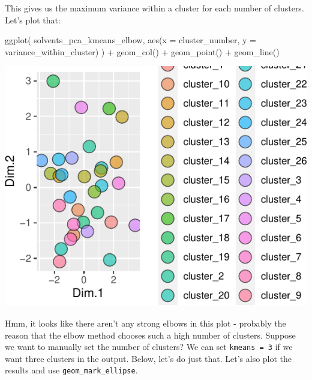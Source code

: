 \documentclass[
]{krantz}
\newenvironment{Shaded}{\begin{snugshade}}{\end{snugshade}}
\newcommand{\AttributeTok}[1]{\textcolor[rgb]{0.77,0.63,0.00}{#1}}
\newcommand{\FunctionTok}[1]{\textcolor[rgb]{0.00,0.00,0.00}{#1}}
\newcommand{\NormalTok}[1]{#1}
\newcommand{\SpecialCharTok}[1]{\textcolor[rgb]{0.00,0.00,0.00}{#1}}
\begin{document}
This gives us the maximum variance within a cluster for each number of clusters. Let's plot that:

\begin{Shaded}
\begin{Highlighting}[]
\FunctionTok{ggplot}\NormalTok{(}
\NormalTok{  solvents\_pca\_kmeans\_elbow,}
  \FunctionTok{aes}\NormalTok{(}\AttributeTok{x =}\NormalTok{ cluster\_number, }\AttributeTok{y =}\NormalTok{ variance\_within\_cluster)}
\NormalTok{) }\SpecialCharTok{+}
  \FunctionTok{geom\_col}\NormalTok{() }\SpecialCharTok{+}
  \FunctionTok{geom\_point}\NormalTok{() }\SpecialCharTok{+}
  \FunctionTok{geom\_line}\NormalTok{()}
\end{Highlighting}
\end{Shaded}

\begin{center}\includegraphics{index_files/figure-latex/unnamed-chunk-105-1} \end{center}

Hmm, it looks like there aren't any strong elbows in this plot - probably the reason that the elbow method chooses such a high number of clusters. Suppose we want to manually set the number of clusters? We can set \texttt{kmeans\ =\ 3} if we want three clusters in the output. Below, let's do just that. Let's also plot the results and use \texttt{geom\_mark\_ellipse}.
\end{document}
